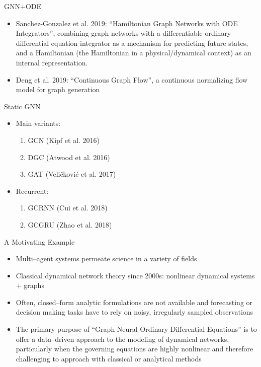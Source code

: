 \documentclass{beamer}
\begin{document}
\begin{frame}{GNN+ODE}
\begin{itemize}
\item Sanchez-Gonzalez et al. 2019: ``Hamiltonian Graph Networks with ODE Integrators'', combining graph networks with a differentiable ordinary differential equation integrator as a mechanism for predicting future states, and a Hamiltonian (the Hamiltonian in a physical/dynamical context) as an internal representation.
\item Deng et al. 2019: ``Continuous Graph Flow'', a continuous normalizing flow model for graph generation
\end{itemize}
\end{frame}

\begin{frame}{Static GNN}
\begin{itemize}
\item Main variants:
\begin{enumerate}
\item GCN (Kipf et al. 2016)
\item DGC (Atwood et al. 2016)
\item GAT (Veli\v{c}kovi\'{c} et al. 2017)
\end{enumerate}
\item Recurrent:
\begin{enumerate}
\item GCRNN (Cui et al. 2018)
\item GCGRU (Zhao et al. 2018)
\end{enumerate}
\end{itemize}
\end{frame}

\begin{frame}{A Motivating Example}
\begin{itemize}
\item Multi–agent systems permeate science in a variety of fields
\item Classical dynamical network theory since 2000s: nonlinear dynamical systems + graphs
\item Often, closed–form analytic formulations are not available
and forecasting or decision making tasks have to rely
on noisy, irregularly sampled observations
\item The primary purpose
of ``Graph Neural Ordinary Differential Equations'' is to offer a data–driven approach to the modeling
of dynamical networks, particularly when the governing
equations are highly nonlinear and therefore challenging
to approach with classical or analytical methods
\end{itemize}
\end{frame}
\end{document}

